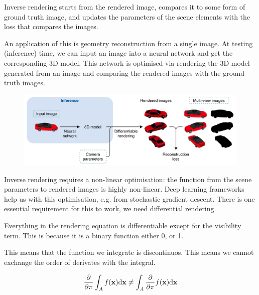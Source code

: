 \documentclass{article}
\begin{document}
\vspace{5px}

Inverse rendering starts from the rendered image, compares it to some form of ground truth image, and updates the parameters
of the scene elements with the loss that compares the images.

\vspace{20px}

An application of this is geometry reconstruction from a single image. At testing (inference) time, we can input an image
into a neural network and get the corresponding 3D model. This network is optimised via rendering the 3D model generated from
an image and comparing the rendered images with the ground truth images.

\begin{figure}[!ht]
    \centering
    \includegraphics[width=0.9\linewidth]{images/diff_rendering.png}
\end{figure}

Inverse rendering requires a non-linear optimisation: the function from the scene parameters to rendered images is
highly non-linear. Deep learning frameworks help us with this optimisation, e.g. from stochastic gradient descent.
There is one essential requirement for this to work, we need differential rendering.

\vspace{10px}

Everything in the rendering equation is differentiable except for the visibility term. This is because it is a binary
function either 0, or 1.

\vspace{5px}

This means that the function we integrate is discontinuos. This means we cannot exchange the order of derivates with the integral.

\[
    \frac{\partial}{\partial \pi} \int_A f(\text{\textbf{x}}) \text{d}\text{\textbf{x}} \not= \int_A \frac{\partial}{\partial \pi} f(\text{\textbf{x}}) \text{d}\text{\textbf{x}}
\]
\end{document}
